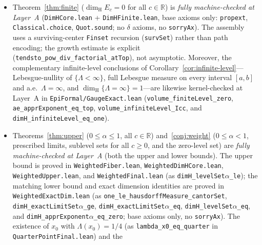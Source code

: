 \documentclass[11pt]{article}
\theoremstyle{definition}
\theoremstyle{remark}
\newcommand{\R}{\mathbb{R}}
\newcommand{\dimH}{\dim_{\mathrm{H}}}
\newcommand{\Lam}{\Lambda}
\begin{document}
\begin{itemize}[leftmargin=1.5em]
The critical-gauge statements for general recurrences and the subcritical
dimension upper bound are verified by \texttt{PolyGaugeAndPhaseTransition.lean}
and \texttt{PolyWeightedUpper.lean}, respectively. The lower bound for arbitrary
$\texttt{PolyRecData}$ is verified in \texttt{PolyWeightedLower.lean}.
\item Theorem~\ref{thm:finite} ($\dimH E_c=0$ for all $c\in\R$) is \emph{fully
machine-checked at Layer~A} (\texttt{DimHCore.lean} + \texttt{DimHFinite.lean},
base axioms only: \texttt{propext}, \texttt{Classical.choice},
\texttt{Quot.sound}; no $\delta$ axioms, no \texttt{sorryAx}). The assembly uses
a surviving-center \texttt{Finset} recursion (\texttt{survSet}) rather than path
encoding; the growth estimate is explicit
(\texttt{tendsto\_pow\_div\_factorial\_atTop}), not asymptotic. Moreover, the
complementary infinite-level conclusions of
Corollary~\ref{cor:infinite-level}---Lebesgue-nullity of $\{\Lam<\infty\}$,
full Lebesgue measure on every interval $[a,b]$ and a.e.\ $\Lam=\infty$, and
$\dimH\{\Lam=\infty\}=1$---are likewise kernel-checked at Layer~A in
\texttt{EpiFormal/\allowbreak{}GaugeExact.lean}
(\texttt{volume\_finiteLevel\_zero}, \texttt{ae\_apprExponent\_eq\_top},
\texttt{volume\_infiniteLevel\_Icc}, and
\texttt{dimH\_infiniteLevel\_eq\_one}).
\item Theorems~\ref{thm:upper} ($0\le\alpha\le1$, all $c\in\R$)
and~\ref{conj:weight} ($0\le\alpha<1$, prescribed limits, sublevel sets for all
$c\ge0$, and the zero-level set) are \emph{fully machine-checked at Layer~A}
(both the upper and lower bounds). The upper bound is proved in
\texttt{Weighted\allowbreak Fiber.lean}, \texttt{Weighted\allowbreak DimHCore.lean},
\texttt{Weighted\allowbreak Upper.lean}, and \texttt{Weighted\allowbreak Final.lean}
(as \texttt{dimH\_\allowbreak levelSet\ensuremath{\alpha}\_le}); the
matching lower bound and exact dimension identities are proved in
\texttt{Weighted\allowbreak ExactDim.lean}
(as \texttt{one\_\allowbreak le\_\allowbreak hausdorff\allowbreak Measure\_\allowbreak cantorSet},
\texttt{dimH\_\allowbreak exact\allowbreak LimitSet\ensuremath{\alpha}\_ge},
\texttt{dimH\_\allowbreak exact\allowbreak LimitSet\ensuremath{\alpha}\_eq},
\texttt{dimH\_\allowbreak levelSet\ensuremath{\alpha}\_eq}, and
\texttt{dimH\_\allowbreak appr\allowbreak Exponent\ensuremath{\alpha}\_eq\_\allowbreak zero}; base
axioms only, no \texttt{sorryAx}). The existence of $x_0$ with $\Lam(x_0)=1/4$
(as \texttt{lambda\_\allowbreak x0\_\allowbreak eq\_\allowbreak quarter} in \texttt{Quarter\allowbreak Point\allowbreak Final.lean}) and the

\end{itemize}
\end{document}
